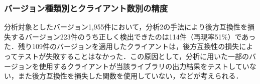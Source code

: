 \documentclass[submit]{ipsj}
\newcommand{\todo}[1]{\colorbox{yellow}{{\bf TODO}:}{\color{red} {\textbf{[#1]}}}}
\begin{document}
{%



\subsubsection{バージョン種類別とクライアント数別の精度}

分析対象としたバージョン1,955件において，分析2の手法により後方互換性を損失するバージョン223件のうち正しく検出できたのは114件（再現率51\%）であった．残り109件のバージョンを適用したクライアントは，後方互換性の損失によってテストが失敗することはなかった．この原因として，分析に用いた一部のバージョンを使用するクライアントが当該ライブラリの出力結果をテストしていない，また後方互換性を損失した関数を使用していない，などが考えられる．

}
\end{document}
